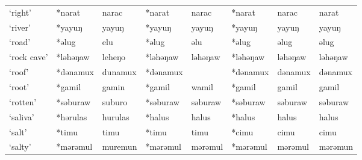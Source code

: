 \begin{landscape}
\begin{longtable}[c]{@{}p{3cm}<{\raggedright}p{2.75cm}<{\raggedright}p{2.75cm}<{\raggedright}p{2.75cm}<{\raggedright}p{2.75cm}<{\raggedright}p{2.75cm}<{\raggedright}p{2.75cm}<{\raggedright}p{2.75cm}<{\raggedright}@{}}
`right'                                              & *narat       & narac                         & *narat         & narac                      & *narat           & narac                    & narat                             \\
`river'                                              & *yayuŋ       & yayuŋ                         & *yayuŋ         & yayuŋ                      & *yayuŋ           & yayuŋ                    & yayuŋ                             \\
`road'                                               & *əlug        & elu                           & *əlug          & əlu                        & *əlug            & əlug                     & əlug                              \\
`rock cave'                                          & *ləhəŋaw     & leheŋo                        & *ləhəŋaw       & ləhəŋaw                    & *ləhəŋaw         & ləhəŋaw                  & ləhəŋaw                           \\
`roof'                                               & *dənamux     & dunamux                       & *dənamux       &                            & *dənamux         & dənamux                  & dənamux                           \\
`root'                                               & *gamil       & gamin                         & *gamil         & wamil                      & *gamil           & gamil                    & gamil                             \\
`rotten'                                             & *səburaw     & suburo                        & *səburaw       & səburaw                    & *səburaw         & səburaw                  & səburaw                           \\
`saliva'                                             & *hərulas     & hurulas                       & *halus         & halus                      & *halus           & halus                    & halus                             \\
`salt'                                               & *timu        & timu                          & *timu          & timu                       & *cimu            & cimu                     & cimu                              \\
`salty'                                              & *mərəmul     & muremun                       & *mərəmul       & mərəmul                    & *mərəmul         & mərəmul                  & mərəmun                           \\

\end{longtable}
\end{landscape}
